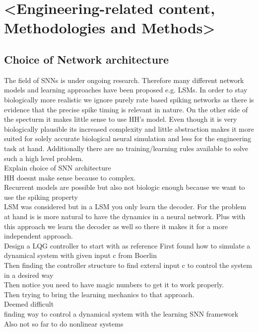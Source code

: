 \chapter{<Engineering-related content, Methodologies and Methods>}



\section{Choice of Network architecture}

The field of \acp{SNN} is under ongoing research. Therefore many different network models and learning approaches have been proposed e.g. \acp{LSM}\cite{dewolf_spiking_2016}. In order to stay biologically more realistic we ignore purely rate based spiking networks as there is evidence that the precise spike timing is relevant in nature\cite{brette_philosophy_2015}\cite{putney_precise_2019}.
On the other side of the specturm it makes little sense to use \ac{HH}'s model. Even though it is very biologically plausible its increased complexity and little abstraction makes it more suited for solely accurate biological neural simulation and less for the engineering task at hand. Additionally there are no training/learning rules available to solve such a high level problem.\\





Explain choice of SNN architecture\\
HH doesnt make sense because to complex.\\
Recurrent models are possible but also not biologic enough because we want to use the spiking property\\
LSM was considered but in a LSM you only learn the decoder. For the problem at hand is is more natural to have the dynamics in a neural network. Plus with this approach we learn the decoder as well so there it makes it for a more independent approach.\\



Design a LQG controller to start with as reference
First found how to simulate a dynamical system with given input c from Boerlin\\
Then finding the controller structure to find exteral input c to control the system in a desired way\\
Then notice you need to have magic numbers to get it to work properly.\\
Then trying to bring the learning mechanics to that approach.\\
Deemed difficult\\
finding way to control a dynamical system with the learning SNN framework\\
Also not so far to do nonlinear systems\\


